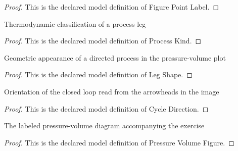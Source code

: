 \begin{proof}
  This is the declared model definition of Figure Point Label.
\end{proof}
\begin{definition}
  \label{def:physics:phyx-mini-0342:phyxminiproblems-problemphyxmini0342-processkind}
  Thermodynamic classification of a process leg
\end{definition}
\begin{proof}
  This is the declared model definition of Process Kind.
\end{proof}
\begin{definition}
  \label{def:physics:phyx-mini-0342:phyxminiproblems-problemphyxmini0342-legshape}
  Geometric appearance of a directed process in the pressure-volume plot
\end{definition}
\begin{proof}
  This is the declared model definition of Leg Shape.
\end{proof}
\begin{definition}
  \label{def:physics:phyx-mini-0342:phyxminiproblems-problemphyxmini0342-cycledirection}
  Orientation of the closed loop read from the arrowheads in the image
\end{definition}
\begin{proof}
  This is the declared model definition of Cycle Direction.
\end{proof}
\begin{definition}
  \label{def:physics:phyx-mini-0342:phyxminiproblems-problemphyxmini0342-pressurevolumefigure}
  The labeled pressure-volume diagram accompanying the exercise
\end{definition}
\begin{proof}
  This is the declared model definition of Pressure Volume Figure.
\end{proof}
